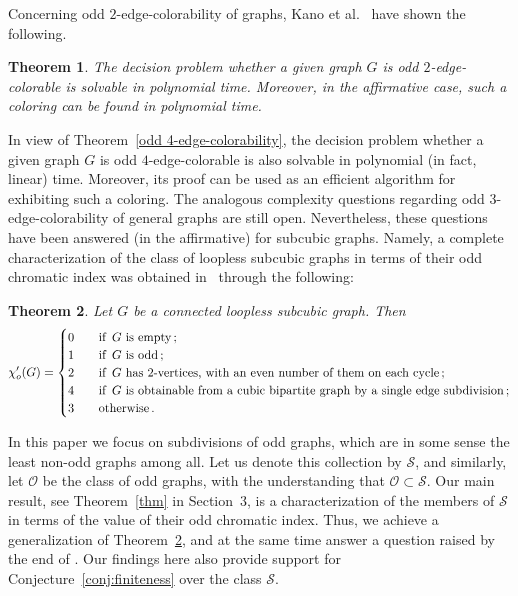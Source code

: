 \documentclass[a4paper,12pt]{article}
\newtheorem{theorem}{Theorem}[section]
\numberwithin{equation}{section}
\begin{document}
Concerning odd $2$-edge-colorability of graphs, Kano et al.~\cite{KanKatVar18} have shown the following.

\begin{theorem}
    \label{Kano}
The decision problem whether a given graph $G$ is odd $2$-edge-colorable is solvable in polynomial time. Moreover, in the affirmative case, such a coloring can be found in polynomial time.
\end{theorem}

In view of Theorem~\ref{odd 4-edge-colorability}, the decision problem whether a given graph $G$ is odd $4$-edge-colorable is also solvable in polynomial (in fact, linear) time. Moreover, its proof can be used as an efficient algorithm for exhibiting such a coloring. The analogous complexity questions regarding odd $3$-edge-colorability of general graphs are still open. Nevertheless, these questions have been answered (in the affirmative) for subcubic graphs. Namely, a complete characterization of the class of loopless subcubic graphs in terms of their odd chromatic index was obtained in~\cite{AtaPetSkr16} through the following:

\begin{theorem}
    \label{thm:characterizationsubcubic}
Let $G$ be a connected loopless subcubic graph. Then
\begin{equation*}
\chi'_o(G)=
\begin{cases}
0 & \text{\quad if\, } G \text{ is empty}\,;\\
1 & \text{\quad if \,} G \text{ is odd} \,;\\
2 & \text{\quad if \,} G \text{ has 2-vertices, with an even number of them on each cycle}\,;\\
4 & \text{\quad if \,} G \text{ is obtainable from a cubic bipartite graph by a single edge subdivision}\,;\\
3 & \text{\quad otherwise}\,.
\end{cases}
\end{equation*}
\end{theorem}

In this paper we focus on subdivisions of odd graphs, which are in some sense the least non-odd graphs among all. Let us denote this collection by $\mathcal{S}$, and similarly, let $\mathcal{O}$ be the class of odd graphs, with the understanding that $\mathcal{O}\subset\mathcal{S}$. Our main result, see Theorem~\ref{thm} in Section~$3$, is a characterization of the members of $\mathcal{S}$ in terms of the value of their odd chromatic index. Thus, we achieve a generalization of Theorem~\ref{thm:characterizationsubcubic}, and at the same time answer a question raised by the end of \cite{Pet18}. Our findings here also provide support for  Conjecture~\ref{conj:finiteness} over the class $\mathcal{S}$.
\end{document}
